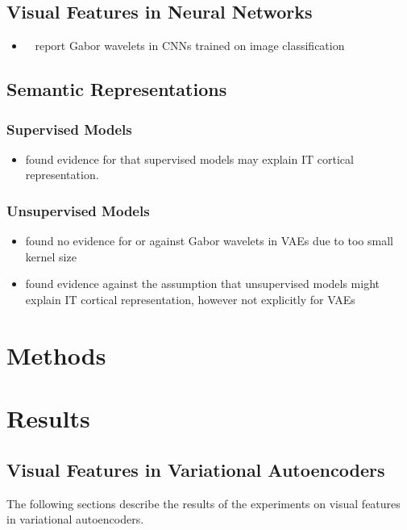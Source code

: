 \documentclass[11pt]{article}
\begin{document}
    \subsection{Visual Features in Neural Networks}\label{subsec:visual_features_in_neural_networks}
    \begin{itemize}
        \item~\cite{krizhevsky2012imagenet} report Gabor wavelets in \acp{CNN} trained on image classification
    \end{itemize}
    \subsection{Semantic Representations}\label{subsec:semantic-representations}
    \subsubsection{Supervised Models}
    \begin{itemize}
        \item \citet{khaligh2014deep} found evidence for that supervised models may explain \ac{IT} cortical representation.
    \end{itemize}

    \subsubsection{Unsupervised Models}
    \begin{itemize}
        \item \citet{han2019variational} found no evidence for or against Gabor wavelets in \acp{VAE} due to too small kernel size
        \item \citet{khaligh2014deep} found evidence against the assumption that unsupervised models might explain \ac{IT} cortical representation, however not explicitly for \acp{VAE}
    \end{itemize}


    \section{Methods}\label{sec:methods}
    


    \section{Results}\label{sec:results}

    \subsection{Visual Features in Variational Autoencoders}\label{subsec:results_visual_features_in_variational_autoencoders}
    The following sections describe the results of the experiments on visual features in variational autoencoders.
\end{document}
